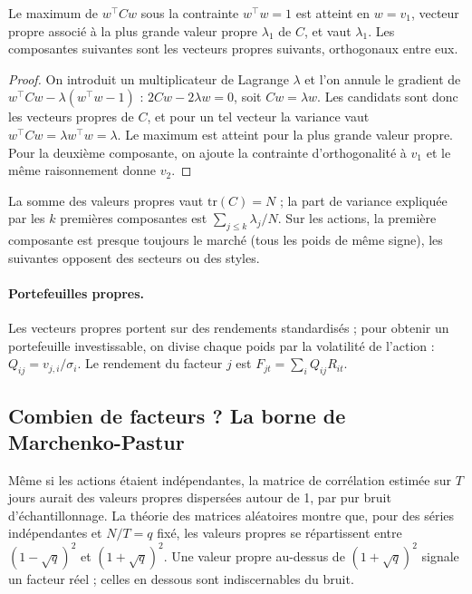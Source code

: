 \begin{proposition}\label{c10:prop:pca}
Le maximum de $w^\top Cw$ sous la contrainte $w^\top w = 1$ est atteint en $w = v_1$, vecteur propre associé à la plus grande valeur propre $\lambda_1$ de $C$, et vaut $\lambda_1$. Les composantes suivantes sont les vecteurs propres suivants, orthogonaux entre eux.
\end{proposition}
\begin{proof}
On introduit un multiplicateur de Lagrange $\lambda$ et l'on annule le gradient de $w^\top Cw - \lambda(w^\top w - 1)$ : $2Cw - 2\lambda w = 0$, soit $Cw = \lambda w$. Les candidats sont donc les vecteurs propres de $C$, et pour un tel vecteur la variance vaut $w^\top Cw = \lambda w^\top w = \lambda$. Le maximum est atteint pour la plus grande valeur propre. Pour la deuxième composante, on ajoute la contrainte d'orthogonalité à $v_1$ et le même raisonnement donne $v_2$.
\end{proof}

La somme des valeurs propres vaut $\mathrm{tr}(C) = N$ ; la part de variance expliquée par les $k$ premières composantes est $\sum_{j\le k}\lambda_j/N$. Sur les actions, la première composante est presque toujours le \og marché\fg{} (tous les poids de même signe), les suivantes opposent des secteurs ou des styles.

\paragraph{Portefeuilles propres.} Les vecteurs propres portent sur des rendements standardisés ; pour obtenir un portefeuille investissable, on divise chaque poids par la volatilité de l'action : $Q_{ij} = v_{j,i}/\sigma_i$. Le rendement du facteur $j$ est $F_{jt} = \sum_iQ_{ij}R_{it}$.

\subsection{Combien de facteurs ? La borne de Marchenko-Pastur}

Même si les actions étaient indépendantes, la matrice de corrélation estimée sur $T$ jours aurait des valeurs propres dispersées autour de 1, par pur bruit d'échantillonnage. La théorie des matrices aléatoires montre que, pour des séries indépendantes et $N/T = q$ fixé, les valeurs propres se répartissent entre $(1-\sqrt q)^2$ et $(1+\sqrt q)^2$. Une valeur propre au-dessus de $(1+\sqrt q)^2$ signale un facteur réel ; celles en dessous sont indiscernables du bruit.

